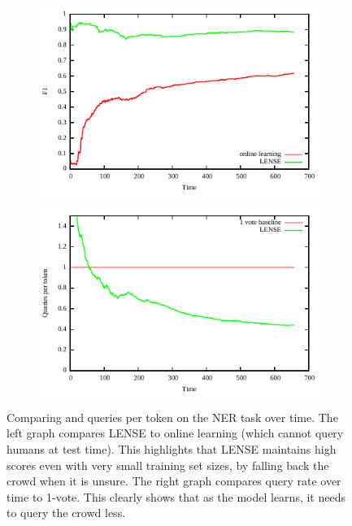 \begin{figure}[t]
  \centering
  \begin{subfigure}[b]{0.49\textwidth}
  \includegraphics[width=\textwidth]{figures/ner_2_class/f1_plot/f1_vs_time.pdf}
\end{subfigure}
  \begin{subfigure}[b]{0.49\textwidth}
  \includegraphics[width=\textwidth]{figures/ner_2_class/cost_plot/cost_vs_time.pdf}
  \end{subfigure}
  \caption{Comparing \fone{} and queries per token on the NER task over time. The left graph compares LENSE to online learning (which cannot query humans at test time). This highlights that LENSE maintains high \fone{} scores even with very small training set sizes, by falling back the crowd when it is unsure. The right graph compares query rate over time to 1-vote. This clearly shows that as the model learns, it needs to query the crowd less.}
\label{fig:ner-f1}
\end{figure}


